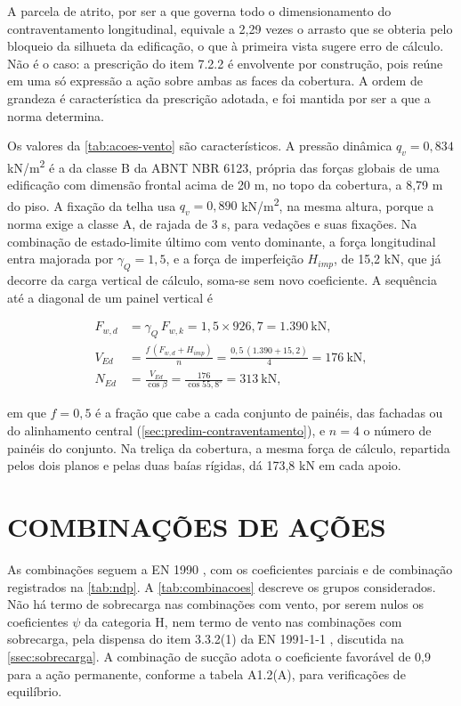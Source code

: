A parcela de atrito, por ser a que governa todo o
dimensionamento do contraventamento longitudinal, equivale a 2,29 vezes o
arrasto que se obteria pelo bloqueio da silhueta da edificação, o que à primeira
vista sugere erro de cálculo. Não é o caso: a prescrição do item 7.2.2 é
envolvente por construção, pois reúne em uma só expressão a ação sobre ambas as
faces da cobertura. A ordem de grandeza é característica da prescrição adotada,
e foi mantida por ser a que a norma determina.

Os valores da \autoref{tab:acoes-vento} são característicos. A pressão dinâmica
$q_v = 0{,}834$ kN/m\textsuperscript{2} é a da classe B da ABNT NBR 6123, própria
das forças globais de uma edificação com dimensão frontal acima de 20 m, no topo da
cobertura, a 8,79 m do piso. A fixação da telha usa $q_v = 0{,}890$
kN/m\textsuperscript{2}, na mesma altura, porque a norma exige a classe A, de rajada
de 3 s, para vedações e suas fixações. Na combinação de estado-limite último com
vento dominante, a força longitudinal entra majorada por $\gamma_Q = 1{,}5$, e a
força de imperfeição $H_{imp}$, de 15,2 kN, que já decorre da carga vertical de
cálculo, soma-se sem novo coeficiente. A sequência até a diagonal de um painel
vertical é

\begin{align}
    F_{w,d} &= \gamma_Q\,F_{w,k} = 1{,}5 \times 926{,}7 = 1.390~\text{kN}, \nonumber \\
    V_{Ed} &= \frac{f\,(F_{w,d} + H_{imp})}{n} = \frac{0{,}5\,(1.390 + 15{,}2)}{4}
           = 176~\text{kN}, \nonumber \\
    N_{Ed} &= \frac{V_{Ed}}{\cos\beta} = \frac{176}{\cos 55{,}8^\circ} = 313~\text{kN},
    \label{eq:cadeia-vento-longitudinal}
\end{align}

\noindent
em que $f = 0{,}5$ é a fração que cabe a cada conjunto de painéis, das fachadas ou do
alinhamento central (\autoref{sec:predim-contraventamento}), e $n = 4$ o número de
painéis do conjunto. Na treliça da cobertura, a mesma força de cálculo, repartida
pelos dois planos e pelas duas baías rígidas, dá 173,8 kN em cada apoio.

\section{COMBINAÇÕES DE AÇÕES}\label{sec:combinacoes}

As combinações seguem a EN 1990 \cite{EN1990:2002}, com os coeficientes parciais
e de combinação registrados na \autoref{tab:ndp}. A
\autoref{tab:combinacoes} descreve os grupos considerados. Não há termo de
sobrecarga nas combinações com vento, por serem nulos os coeficientes $\psi$ da
categoria H, nem termo de vento nas combinações com sobrecarga, pela dispensa do
item 3.3.2(1) da EN 1991-1-1 \cite{EN1991-1-1:2002}, discutida na
\autoref{ssec:sobrecarga}. A combinação
de sucção adota o coeficiente favorável de 0,9 para a ação permanente, conforme
a tabela A1.2(A), para verificações de equilíbrio.

